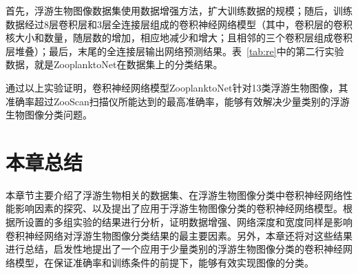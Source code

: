 首先，浮游生物图像数据集使用数据增强方法，扩大训练数据的规模；随后，训练数据经过8层卷积层和3层全连接层组成的卷积神经网络模型（其中，卷积层的卷积核大小和数量，随层数的增加，相应地减少和增大；且相邻的三个卷积层组成卷积层堆叠）；最后，末尾的全连接层输出网络预测结果。表~\ref{tab:re}中的第二行实验数据，就是ZooplanktoNet在数据集上的分类结果。

通过以上实验证明，卷积神经网络模型ZooplanktoNet针对13类浮游生物图像，其准确率超过ZooScan扫描仪所能达到的最高准确率，能够有效解决少量类别的浮游生物图像分类问题。

\section{本章总结}

本章节主要介绍了浮游生物相关的数据集、在浮游生物图像分类中卷积神经网络性能影响因素的探究、以及提出了应用于浮游生物图像分类的卷积神经网络模型。根据所设置的多组实验的结果进行分析，证明数据增强、网络深度和宽度同样是影响卷积神经网络对浮游生物图像分类结果的最主要因素。另外，本章还将对这些结果进行总结，启发性地提出了一个应用于少量类别的浮游生物图像分类的卷积神经网络模型，在保证准确率和训练条件的前提下，能够有效实现图像的分类。












